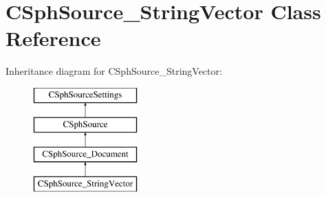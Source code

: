 \hypertarget{classCSphSource__StringVector}{\section{C\-Sph\-Source\-\_\-\-String\-Vector Class Reference}
\label{classCSphSource__StringVector}
}
Inheritance diagram for C\-Sph\-Source\-\_\-\-String\-Vector\-:\begin{figure}[H]
\begin{center}
\leavevmode
\includegraphics[height=4.000000cm]{classCSphSource__StringVector}
\end{center}
\end{figure}
